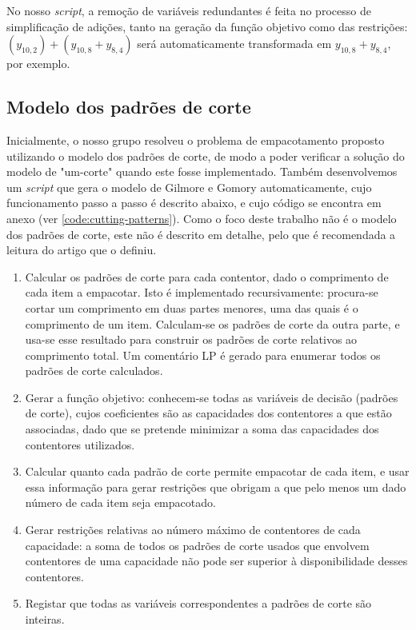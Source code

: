 \documentclass[12pt, a4paper, titlepage]{article}
\begin{document}
No nosso \emph{script}, a remoção de variáveis redundantes é feita no processo de simplificação de
adições, tanto na geração da função objetivo como das restrições:
$(y_{10, 2}) + (y_{10, 8} + y_{8, 4})$ será automaticamente transformada em $y_{10, 8} + y_{8, 4}$,
por exemplo.

\subsection{Modelo dos padrões de corte}

Inicialmente, o nosso grupo resolveu o problema de empacotamento proposto utilizando o modelo dos
padrões de corte, de modo a poder verificar a solução do modelo de "um-corte"{} quando este fosse
implementado. Também desenvolvemos um \emph{script} que gera o modelo de Gilmore e Gomory
automaticamente, cujo funcionamento passo a passo é descrito abaixo, e cujo código se encontra em
anexo (ver \ref{code:cutting-patterns}). Como o foco deste trabalho não é o modelo dos padrões de
corte, este não é descrito em detalhe, pelo que é recomendada a leitura do artigo que o definiu.
\cite{gilmore-and-gomory}

\begin{enumerate}
    \item Calcular os padrões de corte para cada contentor, dado o comprimento de cada item a
        empacotar. Isto é implementado recursivamente: procura-se cortar um comprimento em duas
        partes menores, uma das quais é o comprimento de um item. Calculam-se os padrões de corte da
        outra parte, e usa-se esse resultado para construir os padrões de corte relativos ao
        comprimento total. Um comentário LP é gerado para enumerar todos os padrões de corte
        calculados.

    \item Gerar a função objetivo: conhecem-se todas as variáveis de decisão (padrões de corte),
        cujos coeficientes são as capacidades dos contentores a que estão associadas, dado que se
        pretende minimizar a soma das capacidades dos contentores utilizados.

    \item Calcular quanto cada padrão de corte permite empacotar de cada item, e usar essa
        informação para gerar restrições que obrigam a que pelo menos um dado número de cada item
        seja empacotado.

    \item Gerar restrições relativas ao número máximo de contentores de cada capacidade: a soma de
        todos os padrões de corte usados que envolvem contentores de uma capacidade não pode ser
        superior à disponibilidade desses contentores.

    \item Registar que todas as variáveis correspondentes a padrões de corte são inteiras.
\end{enumerate}
\end{document}
